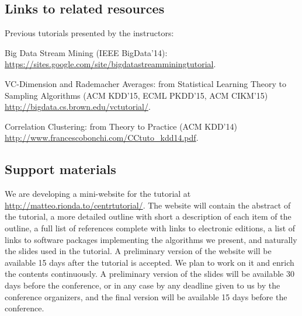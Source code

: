 \documentclass{sig-alternate}
\begin{document}
\subsection*{Links to related resources}
Previous tutorials presented by the instructors:
\begin{description}
	\item Big Data Stream Mining (IEEE BigData'14): \url{https://sites.google.com/site/bigdatastreamminingtutorial}.
	\item VC-Dimension and Rademacher Averages: from Statistical Learning Theory
		to Sampling Algorithms (ACM KDD'15, ECML PKDD'15, ACM CIKM'15) \url{http://bigdata.cs.brown.edu/vctutorial/}.
	\item Correlation Clustering: from Theory to Practice (ACM KDD'14) \url{http://www.francescobonchi.com/CCtuto_kdd14.pdf}.
\end{description}

\subsection*{Support materials}
We are developing a mini-website for the tutorial at
\url{http://matteo.rionda.to/centrtutorial/}. The website will contain the
abstract of the tutorial, a more detailed outline with short a description of
each item of the outline, a full list of references complete with links to
electronic editions, a list of links to software packages implementing the
algorithms we present, and naturally the slides used in the tutorial. A
preliminary version of the website will be available 15 days after the tutorial
is accepted. We plan to work on it and enrich the contents continuously. A
preliminary version of the slides will be available 30 days before the
conference, or in any case by any deadline given to us by the conference
organizers, and the final version will be available 15 days before the
conference.



\end{document}
